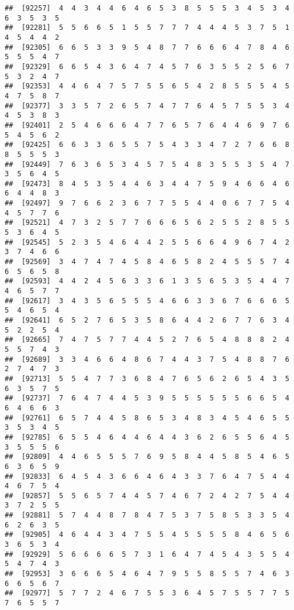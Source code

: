 \documentclass[
]{book}
\begin{document}
\begin{verbatim}
##  [92257]  4  4  3  4  4  6  4  6  5  3  8  5  5  5  3  4  5  3  4  6  3  5  3  5
##  [92281]  5  5  6  6  5  1  5  5  7  7  7  4  4  4  5  3  7  5  1  4  5  4  4  2
##  [92305]  6  6  5  3  3  9  5  4  8  7  7  6  6  6  4  7  8  4  6  5  5  5  4  7
##  [92329]  6  6  5  4  3  6  4  7  4  5  7  6  3  5  5  2  5  6  7  5  3  2  4  7
##  [92353]  4  4  6  4  7  5  7  5  5  6  5  4  2  8  5  5  5  4  5  4  7  5  8  7
##  [92377]  3  3  5  7  2  6  5  7  4  7  7  6  4  5  7  5  5  3  4  4  5  3  8  3
##  [92401]  2  5  4  6  6  6  4  7  7  6  5  7  6  4  4  6  9  7  6  5  4  5  6  2
##  [92425]  6  6  3  3  6  5  5  7  5  4  3  3  4  7  2  7  6  6  8  8  5  5  5  3
##  [92449]  7  6  3  6  5  3  4  5  7  5  4  8  3  5  5  3  5  4  7  3  5  6  4  5
##  [92473]  8  4  5  3  5  4  4  6  3  4  4  7  5  9  4  6  6  4  6  6  4  4  8  3
##  [92497]  9  7  6  6  2  3  6  7  7  5  5  4  4  0  6  7  7  5  4  4  5  7  7  6
##  [92521]  4  7  3  2  5  7  7  6  6  6  5  6  2  5  5  2  8  5  5  5  3  6  4  5
##  [92545]  5  2  3  5  4  6  4  4  2  5  5  6  6  4  9  6  7  4  2  3  7  4  6  6
##  [92569]  3  4  7  4  7  4  5  8  4  6  5  8  2  4  5  5  5  7  4  6  5  6  5  8
##  [92593]  4  4  2  4  5  6  3  3  6  1  3  5  6  5  3  5  4  4  7  4  6  5  7  7
##  [92617]  3  4  3  5  6  5  5  5  4  6  6  3  3  6  7  6  6  6  5  5  4  6  5  4
##  [92641]  6  5  2  7  6  5  3  5  8  6  4  4  2  6  7  7  6  3  4  5  2  2  5  4
##  [92665]  7  4  7  5  7  7  4  4  5  2  7  6  5  4  8  8  8  2  4  5  5  7  4  3
##  [92689]  3  3  4  6  6  4  8  6  7  4  4  3  7  5  4  8  8  7  6  2  7  4  7  3
##  [92713]  5  5  4  7  7  3  6  8  4  7  6  5  6  2  6  5  4  3  5  6  3  5  7  5
##  [92737]  7  6  4  7  4  4  5  3  9  5  5  5  5  5  5  6  6  5  4  6  4  6  6  3
##  [92761]  6  5  7  4  4  5  8  6  5  3  4  8  3  4  5  4  6  5  5  3  5  3  4  5
##  [92785]  6  5  5  4  6  4  4  6  4  4  3  6  2  6  5  5  6  4  5  3  5  5  5  6
##  [92809]  4  4  6  5  5  5  7  6  9  5  8  4  4  5  8  5  4  6  5  6  3  6  5  9
##  [92833]  6  4  5  4  3  6  6  4  6  4  3  3  7  6  4  7  5  4  4  4  6  7  5  4
##  [92857]  5  5  6  5  7  4  4  5  7  4  6  7  2  4  2  7  5  4  4  3  7  2  5  5
##  [92881]  5  7  4  4  8  7  8  4  7  5  3  7  5  8  5  3  3  5  4  6  2  6  3  5
##  [92905]  4  6  4  4  3  4  7  5  5  4  5  5  5  5  8  4  6  5  6  3  6  5  3  4
##  [92929]  5  6  6  6  6  5  7  3  1  6  4  7  4  5  4  3  5  5  4  5  4  7  4  3
##  [92953]  3  6  6  6  5  4  6  4  7  9  5  5  8  5  5  7  4  6  3  6  6  5  6  7
##  [92977]  5  7  7  2  4  6  7  5  5  3  6  4  5  7  5  5  7  7  5  7  6  5  5  7

\end{verbatim}
\end{document}
